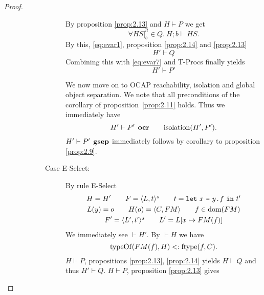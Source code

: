 \begin{proof}
\begin{description}
\begin{description}
\begin{description}
              By proposition \ref{prop:2.13} and $H \vdash P$ we get
              \begin{equation*} 
                \forall HS|_b^d \in Q. \: H; b \vdash HS.
              \end{equation*}
              By this, \eqref{eq:evar1}, proposition \ref{prop:2.14} and \ref{prop:2.13}
              \begin{equation*}
                H' \vdash Q
              \end{equation*}
              Combining this with \eqref{eq:evar7} and {\sc T-Procs} finally
              yields
              \begin{equation*}
                H' \vdash P'
              \end{equation*}

              We now move on to OCAP reachability, isolation and global object
              separation. We note that all preconditions of the corollary of
              proposition~\ref{prop:2.11} holds. Thus we immediately have 
              \begin{equation*}
                H' \vdash P' \:\: \mbox{\bf ocr} \quad\quad \mbox{$\mathrm{isolation}$}(H', P').
              \end{equation*}
              $H' \vdash P' \:\: \mbox{\bf gsep}$ immediately follows by corollary to
              proposition \ref{prop:2.9}.
            \item[Case {\sc E-Select}:] By rule {\sc E-Select}
              \begin{equation}
                \begin{gathered}
                  H = H' \quad\quad F = \mbox{$\langle L, t \rangle^s$} \quad\quad t =
                  \mbox{\texttt{let}~$x$~\texttt{=}~$\mbox{$y$\texttt{.}$f$}$~\texttt{in}~$t'$} \\
                  L(y) = o \quad\quad H(o) = \mbox{$\langle C, FM \rangle$} \quad\quad f \in \mbox{$\mathrm{dom}$}(FM)
                  \\
                  F' = \mbox{$\langle L', t' \rangle^s$} \quad\quad L' = L[x \mapsto FM(f)]
                \end{gathered}
              \end{equation}
              We immediately see $\vdash H'$. By $\vdash H$ we have
              \begin{equation}
                \mbox{$\mathrm{typeOf}$}(FM(f), H) <: \mbox{$\mathrm{ftype}$}(f, C).
              \end{equation}
              $H \vdash P$, propositions \ref{prop:2.13}, \ref{prop:2.14} yields
              $H \vdash Q$ and thus $H' \vdash Q$.
              $H \vdash P$, proposition \ref{prop:2.13} gives 

\end{description}
\end{description}
\end{description}
\end{proof}
